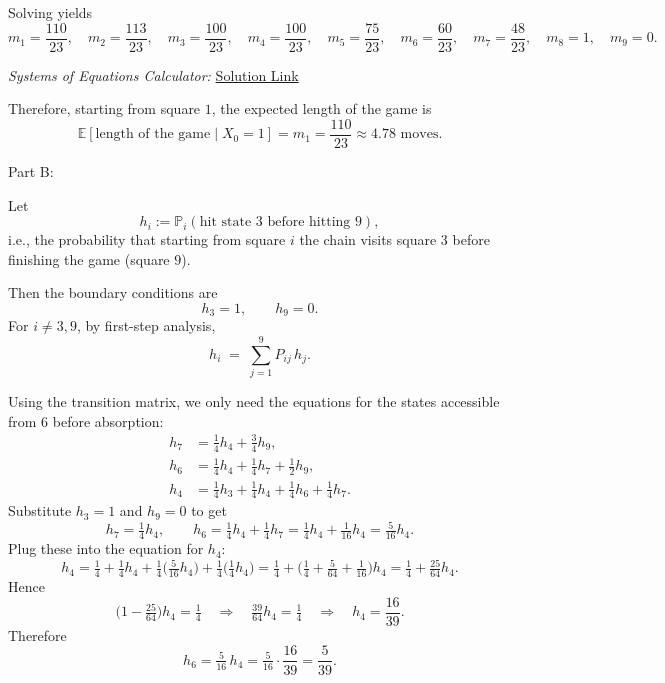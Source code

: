 \documentclass[hidelinks]{article}
\begin{document}
\noindent Solving yields
\[
m_1=\frac{110}{23},\quad
m_2=\frac{113}{23},\quad
m_3=\frac{100}{23},\quad
m_4=\frac{100}{23},\quad
m_5=\frac{75}{23},\quad
m_6=\frac{60}{23},\quad
m_7=\frac{48}{23},\quad
m_8=1,\quad
m_9=0.
\]

\noindent \textit{Systems of Equations Calculator:} \href{https://matrixcalc.org/slu.html#solve-using-Gaussian-elimination%28%7B%7B-1,0,2/4,1/4,0,0,1/4,0,0,-1%7D,%7B0,-1,2/4,1/4,0,1/4,0,0,0,-1%7D,%7B0,0,-3/4,1/4,0,1/4,1/4,0,0,-1%7D,%7B0,0,1/4,-3/4,0,1/4,1/4,0,0,-1%7D,%7B0,0,0,1/4,-1,1/4,1/4,0,1/4,-1%7D,%7B0,0,0,1/4,0,-1,1/4,0,1/2,-1%7D,%7B0,0,0,1/4,0,0,-1,0,3/4,-1%7D,%7B0,0,0,0,0,0,0,-1,1,-1%7D,%7B0,0,0,0,0,0,0,0,1,0%7D%7D%29}{Solution Link}

\medskip

\noindent Therefore, starting from square $1$, the expected length of the game is
\[
\boxed{\mathbb{E}[\text{length of the game}\mid X_0=1]=m_1=\frac{110}{23}\approx 4.78\text{ moves}.}
\]

\noindent Part B:

\noindent Let
\[
h_i := \mathbb{P}_i(\text{hit state }3\text{ before hitting }9),
\]
i.e., the probability that starting from square $i$ the chain visits square $3$
before finishing the game (square $9$).

\noindent Then the boundary conditions are
\[
h_3 = 1,\qquad h_9 = 0.
\]
For $i\neq 3,9$, by first-step analysis,
\[
h_i \;=\; \sum_{j=1}^9 P_{ij}\,h_j.
\]

\noindent Using the transition matrix, we only need the equations for the
states accessible from $6$ before absorption:
\begin{align*}
h_7 &= \tfrac14 h_4 + \tfrac34 h_9,\\
h_6 &= \tfrac14 h_4 + \tfrac14 h_7 + \tfrac12 h_9,\\
h_4 &= \tfrac14 h_3 + \tfrac14 h_4 + \tfrac14 h_6 + \tfrac14 h_7.
\end{align*}
Substitute $h_3=1$ and $h_9=0$ to get
\[
h_7=\tfrac14 h_4,\qquad
h_6=\tfrac14 h_4+\tfrac14 h_7=\tfrac14 h_4+\tfrac1{16}h_4=\tfrac5{16}h_4.
\]
Plug these into the equation for $h_4$:
\[
h_4=\tfrac14+\tfrac14 h_4+\tfrac14\Big(\tfrac5{16}h_4\Big)+\tfrac14\Big(\tfrac14 h_4\Big)
=\tfrac14+\Big(\tfrac14+\tfrac5{64}+\tfrac1{16}\Big)h_4
=\tfrac14+\tfrac{25}{64}h_4.
\]
Hence
\[
\Big(1-\tfrac{25}{64}\Big)h_4=\tfrac14
\quad\Longrightarrow\quad
\tfrac{39}{64}h_4=\tfrac14
\quad\Longrightarrow\quad
h_4=\frac{16}{39}.
\]
Therefore
\[
h_6=\tfrac5{16}\,h_4=\tfrac5{16}\cdot \frac{16}{39}=\frac{5}{39}.
\]
\end{document}
